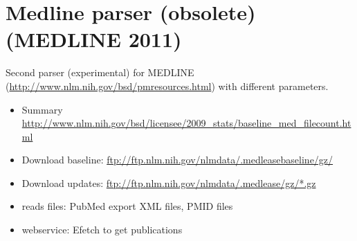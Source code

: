 \section{Medline parser (obsolete) (MEDLINE 2011)}
Second parser (experimental) for MEDLINE (\url{http://www.nlm.nih.gov/bsd/pmresources.html}) with different parameters. 
\begin{itemize}
  \item Summary \url{http://www.nlm.nih.gov/bsd/licensee/2009_stats/baseline_med_filecount.html}
  \item Download baseline: \url{ftp://ftp.nlm.nih.gov/nlmdata/.medleasebaseline/gz/}
  \item Download updates: \url{ftp://ftp.nlm.nih.gov/nlmdata/.medlease/gz/*.gz}
  \item reads files: PubMed export XML files, PMID files
  \item webservice: Efetch to get publications
\end{itemize}


